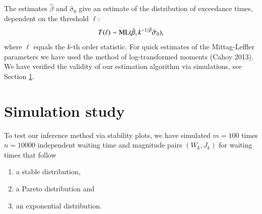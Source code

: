 \documentclass[]{elsarticle} %
\begin{document}
The estimates \(\hat \beta\) and \(\hat \sigma_0\) give an estimate of
the distribution of exceedance times, dependent on the threshold
\(\ell\): \begin{align*}
T(\ell) \sim {\rm ML}(\hat \beta, k^{-1/\hat \beta} \hat \sigma_0),
\end{align*} where \(\ell\) equals the \(k\)-th order statistic. For
quick estimates of the Mittag-Leffler parameters we have used the method
of log-transformed moments (Cahoy 2013). We have verified the validity
of our estimation algorithm via simulations, see Section
\ref{Simulationstudy}.

\hypertarget{Simulationstudy}{%
\section{Simulation study}\label{Simulationstudy}}

To test our inference method via stability plots, we have simulated
\(m=100\) times \(n=10000\) independent waiting time and magnitude pairs
\((W_k, J_k)\) for waiting times that follow

\begin{enumerate}
\def\labelenumi{(\roman{enumi})}
\item
  a stable distribution,
\item
  a Pareto distribution and
\item
  an exponential distribution.
\end{enumerate}
\end{document}
